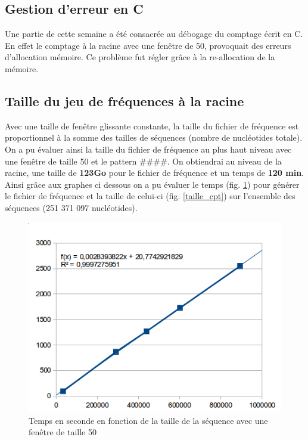 \subsection{Gestion d'erreur en C}
  Une partie de cette semaine a été consacrée au débogage du comptage écrit en C. En effet le comptage à la racine avec une fenêtre de 50, provoquait des erreurs 
  d'allocation mémoire. Ce problème fut régler grâce à la re-allocation de la mémoire. 
  \subsection{Taille du jeu de fréquences à la racine}
  Avec une taille de fenêtre glissante constante, la taille du fichier de fréquence est proportionnel à la somme des tailles de séquences (nombre de nucléotides totale). On a pu évaluer ainsi la taille du fichier de fréquence au plus haut niveau avec une fenêtre de taille 50 et le pattern \#\#\#\#. On obtiendrai au niveau de la racine, une taille de \textbf{123Go} pour le fichier de fréquence et un temps de \textbf{120 min}. Ainsi grâce aux graphes ci dessous on a pu évaluer le temps (fig. \ref{temps_cpt}) pour générer le fichier de fréquence et la taille de celui-ci (fig. \ref{taille_cpt}) sur l'ensemble des séquences (251 371 097 nucléotides).
  
  
\begin{figure}[H]
\begin{center}
\includegraphics[scale=0.6]{./../img/graphe_temps.png}
\caption[Temps de du comptage]{\label{temps_cpt}Temps en seconde en fonction de la taille de la séquence avec une fenêtre de taille 50}
\end{center}
\end{figure}

